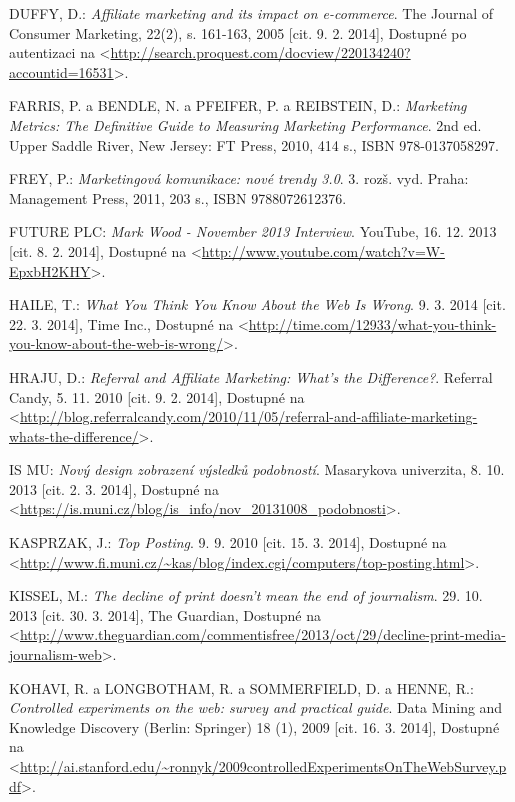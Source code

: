 \documentclass[12pt,oneside,openany]{fithesis}
\begin{document}
\begin{thebibliography}{99}
DUFFY, D.: \emph{Affiliate marketing and its impact on e-commerce}. The Journal of Consumer Marketing, 22(2),
        s. 161-163, 2005 [cit. 9. 2. 2014], Dostupné po autentizaci na {\textless}\url{http://search.proquest.com/docview/220134240?accountid=16531}{\textgreater}.

FARRIS, P. a BENDLE, N. a PFEIFER, P. a REIBSTEIN, D.: \emph{Marketing Metrics: The Definitive Guide to Measuring Marketing
      Performance}. 2nd ed. Upper Saddle River, New Jersey: FT Press, 2010, 414 s., ISBN 978-0137058297.

FREY, P.: \emph{Marketingová komunikace: nové trendy 3.0}. 3. rozš. vyd. Praha: Management Press, 2011, 203 s., ISBN 9788072612376.

FUTURE PLC: \emph{Mark Wood - November 2013 Interview}. YouTube, 16. 12. 2013 [cit. 8. 2. 2014], Dostupné na {\textless}\url{http://www.youtube.com/watch?v=W-EpxbH2KHY}{\textgreater}.

HAILE, T.: \emph{What You Think You Know About the Web Is Wrong}. 9. 3. 2014 [cit. 22. 3. 2014], Time Inc., Dostupné na {\textless}\url{http://time.com/12933/what-you-think-you-know-about-the-web-is-wrong/}{\textgreater}.

HRAJU, D.: \emph{Referral and Affiliate Marketing: What's the Difference?}. Referral Candy, 5. 11. 2010 [cit. 9. 2. 2014], Dostupné na {\textless}\url{http://blog.referralcandy.com/2010/11/05/referral-and-affiliate-marketing-whats-the-difference/}{\textgreater}.

IS MU: \emph{Nový design zobrazení výsledků podobností}. Masarykova univerzita, 8. 10. 2013 [cit. 2. 3. 2014], Dostupné na {\textless}\url{https://is.muni.cz/blog/is_info/nov_20131008_podobnosti}{\textgreater}.

KASPRZAK, J.: \emph{Top Posting}. 9. 9. 2010 [cit. 15. 3. 2014], Dostupné na {\textless}\url{http://www.fi.muni.cz/~kas/blog/index.cgi/computers/top-posting.html}{\textgreater}.

KISSEL, M.: \emph{The decline of print doesn't mean the end of journalism}. 29. 10. 2013 [cit. 30. 3. 2014], The Guardian, Dostupné na {\textless}\url{http://www.theguardian.com/commentisfree/2013/oct/29/decline-print-media-journalism-web}{\textgreater}.

KOHAVI, R. a LONGBOTHAM, R. a SOMMERFIELD, D. a HENNE, R.: \emph{Controlled experiments on the web: survey and practical
      guide}. Data Mining and Knowledge Discovery (Berlin: Springer)
        18 (1), 2009 [cit. 16. 3. 2014], Dostupné na {\textless}\url{http://ai.stanford.edu/~ronnyk/2009controlledExperimentsOnTheWebSurvey.pdf}{\textgreater}. 


\end{thebibliography}
\end{document}
